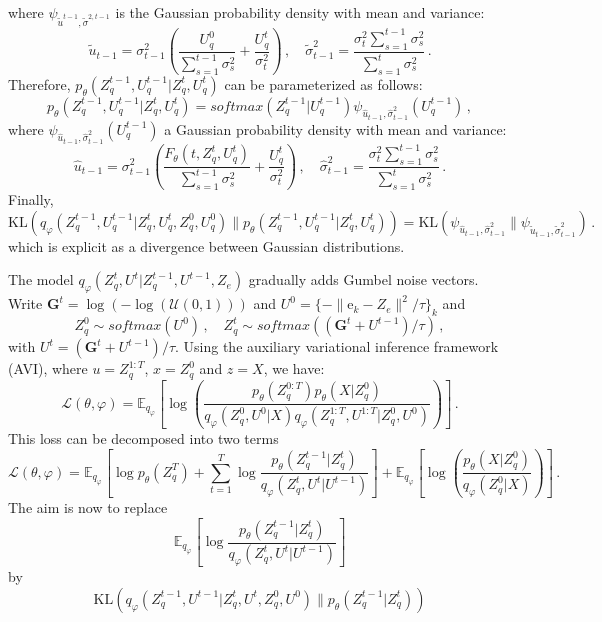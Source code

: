 \documentclass{article}
\newcommand{\rme}{\mathrm{e}}
\begin{document}
where $\psi_{\tilde u^{t-1},\tilde \sigma^{2,t-1}}$ is the Gaussian probability density with mean and variance:
$$
\tilde u_{t-1} = \sigma_{t-1}^2\left(\frac{U_q^{0}}{\sum_{s=1}^{t-1}\sigma_s^2} + \frac{U_q^{t}}{\sigma_t^2}\right)\,,\quad \tilde \sigma_{t-1}^2 = \frac{\sigma_t^2 \sum_{s=1}^{t-1}\sigma_s^2}{\sum_{s=1}^{t}\sigma_s^2}\,.
$$
Therefore, $p_\theta(Z_q^{t-1},U_q^{t-1}|Z_q^t,U_q^t)$ can be parameterized as follows:
$$
p_\theta(Z_q^{t-1},U_q^{t-1}|Z_q^t,U_q^t) = softmax(Z_q^{t-1}|U_q^{t-1})\psi_{\hat u_{t-1},\hat \sigma_{t-1}^2}(U_q^{t-1})\,,
$$
where $\psi_{\hat u_{t-1},\hat \sigma_{t-1}^2}(U_q^{t-1})$ a Gaussian probability density with mean and variance:
$$
\hat u_{t-1} = \sigma_{t-1}^2\left(\frac{F_\theta(t,Z_q^t,U_q^t)}{\sum_{s=1}^{t-1}\sigma_s^2} + \frac{U_q^{t}}{\sigma_t^2}\right)\,,\quad \hat \sigma_{t-1}^2 = \frac{\sigma_t^2 \sum_{s=1}^{t-1}\sigma_s^2}{\sum_{s=1}^{t}\sigma_s^2}\,.
$$
Finally,
$$
\mathrm{KL}(q_\varphi(Z_q^{t-1},U_q^{t-1}|Z_q^t,U_q^{t},Z_q^0,U_q^{0})\|p_\theta(Z_q^{t-1},U_q^{t-1}|Z_q^t,U_q^t)) = \mathrm{KL}(\psi_{\hat u_{t-1},\hat \sigma_{t-1}^2}\|\psi_{\tilde u_{t-1},\tilde \sigma_{t-1}^2})\,.
$$
which is explicit as a divergence between Gaussian distributions.
\clearpage
\newpage


The model $q_{\varphi}(Z_q^t ,U^t| Z_q^{t-1},U^{t-1}, Z_e)$ gradually adds Gumbel noise vectors. Write  $\mathbf{G}^t = \log(-\log(\mathcal{U}(0,1)))$ and $U^0 = \{- \| \rme_k - Z_e\|^2/ \tau\}_k $ and 
$$
Z_q^0 \sim softmax(U^0 )\,, \quad Z_q^t \sim softmax((\mathbf{G}^t +U^{t-1}) / \tau)\,,
$$
with $U^t = (\mathbf{G}^t +U^{t-1}) / \tau$. Using the auxiliary variational inference framework (AVI), where $u = Z_q^{1:T}$, $x = Z_q^0$ and $z = X$, we have:
$$
\mathcal{L}(\theta, \varphi) = \mathbb{E}_{q_\varphi} \left[ \log\left(\frac{p_\theta(Z_q^{0:T})p_\theta(X|Z_q^0)}{q_\varphi(Z_q^0,U^0|X) q_\varphi(Z_q^{1:T},U^{1:T}|Z_q^0,U^0)}\right) \right]\,.
$$
This loss can be decomposed into two terms
$$
\mathcal{L}(\theta, \varphi) = \mathbb{E}_{q_\varphi} \left[\log p_\theta(Z_q^T) + \sum_{t=1}^T\log  \frac{p_\theta(Z_q^{t-1}|Z_q^t)}{q_\varphi(Z_q^{t},U^t|U^{t-1})} \right] + \mathbb{E}_{q_\varphi} \left[ \log\left(\frac{p_\theta(X|Z_q^0)}{q_\varphi(Z_q^0|X)}\right) \right]\,.
$$
The aim is now to replace 
$$
 \mathbb{E}_{q_\varphi} \left[\log  \frac{p_\theta(Z_q^{t-1}|Z_q^t)}{q_\varphi(Z_q^{t},U^t|U^{t-1})} \right]
$$
by
$$
\mathrm{KL}(q_\varphi(Z_q^{t-1},U^{t-1}|Z_q^t,U^{t},Z_q^0,U^{0})\|p_\theta(Z_q^{t-1}|Z_q^t))
$$
\clearpage
\newpage
\end{document}
